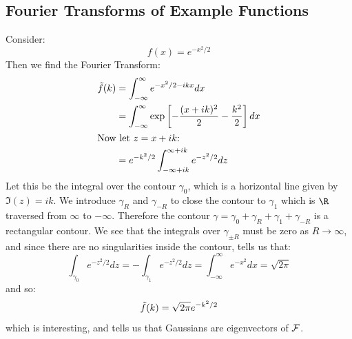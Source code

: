 \documentclass[../Main.tex]{subfiles}
\begin{document}
\subsection{Fourier Transforms of Example Functions}
\begin{example}
    Consider:
    \begin{equation*}
        f(x) = e^{-x^2 / 2}
    \end{equation*}
    Then we find the Fourier Transform:
    \begin{align*}
        \tilde{f}(k) &= \int_{-\infty}^{\infty} e^{-x^2 / 2 - ikx} dx \\
        &= \int_{-\infty}^{\infty} \exp\left[-\frac{(x+ik)^2}{2} - \frac{k^2}{2}\right] dx \\
        \intertext{Now let $z = x + ik$:}
        &= e^{-k^2 / 2} \int_{-\infty + ik}^{\infty + ik} e^{-z^2 / 2} dz
    \end{align*}
    Let this be the integral over the contour $\gamma_0$, which is a horizontal line given by $\Im(z) = ik$. We introduce $\gamma_R$ and $\gamma_{-R}$ to close the contour to $\gamma_1$ which is $\R$ traversed from $\infty$ to $-\infty$. Therefore the contour $\gamma = \gamma_0 + \gamma_R + \gamma_1 + \gamma_{-R}$ is a rectangular contour. We see that the integrals over $\gamma_{\pm R}$ must be zero as $R \to \infty$, and since there are no singularities inside the contour,  tells us that:
    \begin{equation*}
        \int_{\gamma_0} e^{-z^2 / 2} dz = -\int_{\gamma_1} e^{-z^2 / 2} dz = \int_{-\infty}^{\infty} e^{-x^2} dx = \sqrt{2\pi}
    \end{equation*}
    and so:
    \begin{equation*}
        \tilde{f}(k) = \sqrt{2\pi} e^{-k^2 / 2}
    \end{equation*}
    which is interesting, and tells us that Gaussians are eigenvectors of $\mathcal{F}$.
\end{example}
\end{document}
